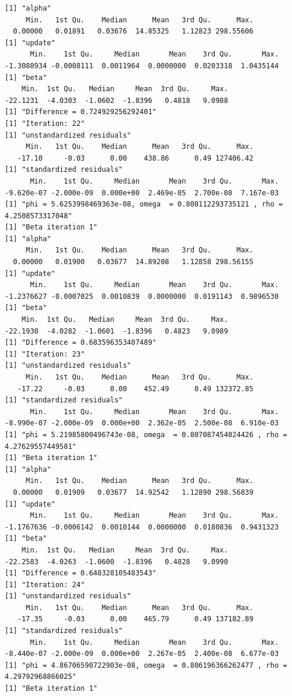 \documentclass[10pt]{article}
\theoremstyle{definition}
\begin{document}
\begin{itemize}
\begin{verbatim}
[1] "alpha"
     Min.   1st Qu.    Median      Mean   3rd Qu.      Max.
  0.00000   0.01891   0.03676  14.85325   1.12823 298.55606
[1] "update"
      Min.    1st Qu.     Median       Mean    3rd Qu.       Max.
-1.3088934 -0.0008111  0.0011964  0.0000000  0.0203318  1.0435144
[1] "beta"
    Min.  1st Qu.   Median     Mean  3rd Qu.     Max.
-22.1231  -4.0303  -1.0602  -1.8396   0.4818   9.0988
[1] "Difference = 0.724929256292401"
[1] "Iteration: 22"
[1] "unstandardized residuals"
     Min.   1st Qu.    Median      Mean   3rd Qu.      Max.
   -17.10     -0.03      0.00    438.86      0.49 127406.42
[1] "standardized residuals"
      Min.    1st Qu.     Median       Mean    3rd Qu.       Max.
-9.620e-07 -2.000e-09  0.000e+00  2.469e-05  2.700e-08  7.167e-03
[1] "phi = 5.6253998469363e-08, omega  = 0.808112293735121 , rho = 4.2508573317048"
[1] "Beta iteration 1"
[1] "alpha"
     Min.   1st Qu.    Median      Mean   3rd Qu.      Max.
  0.00000   0.01900   0.03677  14.89208   1.12858 298.56155
[1] "update"
      Min.    1st Qu.     Median       Mean    3rd Qu.       Max.
-1.2376627 -0.0007025  0.0010839  0.0000000  0.0191143  0.9896530
[1] "beta"
    Min.  1st Qu.   Median     Mean  3rd Qu.     Max.
-22.1930  -4.0282  -1.0601  -1.8396   0.4823   9.0989
[1] "Difference = 0.683596353407489"
[1] "Iteration: 23"
[1] "unstandardized residuals"
     Min.   1st Qu.    Median      Mean   3rd Qu.      Max.
   -17.22     -0.03      0.00    452.49      0.49 132372.85
[1] "standardized residuals"
      Min.    1st Qu.     Median       Mean    3rd Qu.       Max.
-8.990e-07 -2.000e-09  0.000e+00  2.362e-05  2.500e-08  6.910e-03
[1] "phi = 5.21985800496743e-08, omega  = 0.807087454024426 , rho = 4.27629557449581"
[1] "Beta iteration 1"
[1] "alpha"
     Min.   1st Qu.    Median      Mean   3rd Qu.      Max.
  0.00000   0.01909   0.03677  14.92542   1.12890 298.56839
[1] "update"
      Min.    1st Qu.     Median       Mean    3rd Qu.       Max.
-1.1767636 -0.0006142  0.0010144  0.0000000  0.0180836  0.9431323
[1] "beta"
    Min.  1st Qu.   Median     Mean  3rd Qu.     Max.
-22.2583  -4.0263  -1.0600  -1.8396   0.4828   9.0990
[1] "Difference = 0.648328105483543"
[1] "Iteration: 24"
[1] "unstandardized residuals"
     Min.   1st Qu.    Median      Mean   3rd Qu.      Max.
   -17.35     -0.03      0.00    465.79      0.49 137182.89
[1] "standardized residuals"
      Min.    1st Qu.     Median       Mean    3rd Qu.       Max.
-8.440e-07 -2.000e-09  0.000e+00  2.267e-05  2.400e-08  6.677e-03
[1] "phi = 4.86706590722903e-08, omega  = 0.806196366262477 , rho = 4.29792968866025"
[1] "Beta iteration 1"

\end{verbatim}
\end{itemize}
\end{document}
